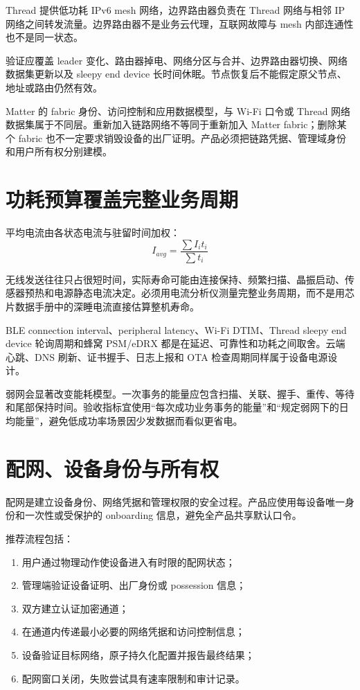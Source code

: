 Thread 提供低功耗 IPv6 mesh 网络，边界路由器负责在 Thread 网络与相邻 IP 网络之间转发流量。边界路由器不是业务云代理，互联网故障与 mesh 内部连通性也不是同一状态。

验证应覆盖 leader 变化、路由器掉电、网络分区与合并、边界路由器切换、网络数据集更新以及 sleepy end device 长时间休眠。节点恢复后不能假定原父节点、地址或路由仍然有效。

Matter 的 fabric 身份、访问控制和应用数据模型，与 Wi-Fi 口令或 Thread 网络数据集属于不同层。重新加入链路网络不等同于重新加入 Matter fabric；删除某个 fabric 也不一定要求销毁设备的出厂证明。产品必须把链路凭据、管理域身份和用户所有权分别建模。

\section{功耗预算覆盖完整业务周期}

平均电流由各状态电流与驻留时间加权：
\begin{equation}
  I_{avg}=\frac{\sum I_i t_i}{\sum t_i}
\end{equation}

无线发送往往只占很短时间，实际寿命可能由连接保持、频繁扫描、晶振启动、传感器预热和电源静态电流决定。必须用电流分析仪测量完整业务周期，而不是用芯片数据手册中的深睡电流直接估算整机寿命。

BLE connection interval、peripheral latency、Wi-Fi DTIM、Thread sleepy end device 轮询周期和蜂窝 PSM/eDRX 都是在延迟、可靠性和功耗之间取舍。云端心跳、DNS 刷新、证书握手、日志上报和 OTA 检查周期同样属于设备电源设计。

弱网会显著改变能耗模型。一次事务的能量应包含扫描、关联、握手、重传、等待和尾部保持时间。验收指标宜使用“每次成功业务事务的能量”和“规定弱网下的日均能量”，避免低成功率场景因少发数据而看似更省电。

\section{配网、设备身份与所有权}

配网是建立设备身份、网络凭据和管理权限的安全过程。产品应使用每设备唯一身份和一次性或受保护的 onboarding 信息，避免全产品共享默认口令。

推荐流程包括：
\begin{enumerate}
  \item 用户通过物理动作使设备进入有时限的配网状态；
  \item 管理端验证设备证明、出厂身份或 possession 信息；
  \item 双方建立认证加密通道；
  \item 在通道内传递最小必要的网络凭据和访问控制信息；
  \item 设备验证目标网络，原子持久化配置并报告最终结果；
  \item 配网窗口关闭，失败尝试具有速率限制和审计记录。
\end{enumerate}

